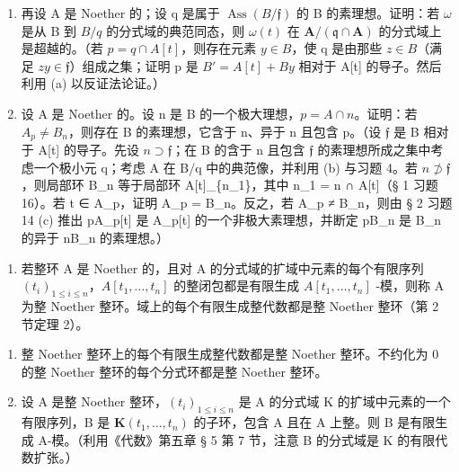 \begin{enumerate}
\def\labelenumi{(\alph{enumi})}
\setcounter{enumi}{1}
\item
  再设 A 是 Noether 的；设 q 是属于 \(\operatorname{Ass}(B/\mathfrak{f})\) 的 B 的素理想。证明：若 \(\omega\) 是从 B 到 \(B/q\) 的分式域的典范同态，则 \(\omega(t)\) 在 \(\mathbf{A}/(\mathfrak{q} \cap \mathbf{A})\) 的分式域上是超越的。（若 \(p = q \cap A[t]\)，则存在元素 \(y \in B\)，使 q 是由那些 \(z \in B\)（满足 \(zy \in \mathfrak{f}\)）组成之集；证明 p 是 \(B' = A[t] + By\) 相对于 A{[}t{]} 的导子。然后利用 (a) 以反证法论证。）
\item
  设 A 是 Noether 的。设 n 是 B 的一个极大理想，\(p = A \cap n\)。证明：若 \(A_{p} \neq B_{n}\)，则存在 B 的素理想，它含于 n、异于 n 且包含 p。（设 \(\mathfrak{f}\) 是 B 相对于 A{[}t{]} 的导子。先设 \(n \supset \mathfrak{f}\)；在 B 的含于 n 且包含 \(\mathfrak{f}\) 的素理想所成之集中考虑一个极小元 q；考虑 A 在 B/q 中的典范像，并利用 (b) 与习题 4。若 \(n \not\supset \mathfrak{f}\)，则局部环 B\_n 等于局部环 A{[}t{]}\_\{n\_1\}，其中 n\_1 = n ∩ A{[}t{]}（§ 1 习题 16）。若 t ∈ A\_p，证明 A\_p = B\_n。反之，若 A\_p ≠ B\_n，则由 § 2 习题 14 (c) 推出 pA\_p{[}t{]} 是 A\_p{[}t{]} 的一个非极大素理想，并断定 pB\_n 是 B\_n 的异于 nB\_n 的素理想。）
\end{enumerate}

\begin{enumerate}
\def\labelenumi{\arabic{enumi}.}
\setcounter{enumi}{5}
\tightlist
\item
  若整环 A 是 Noether 的，且对 A 的分式域的扩域中元素的每个有限序列 \((t_{i})_{1\leq i\leq n}\)，\(A[t_{1},\ldots,t_{n}]\) 的整闭包都是有限生成 \(A[t_{1},\ldots,t_{n}]\) -模，则称 A 为整 Noether 整环。域上的每个有限生成整代数都是整 Noether 整环（第 2 节定理 2）。
\end{enumerate}

\begin{enumerate}
\def\labelenumi{(\alph{enumi})}
\item
  整 Noether 整环上的每个有限生成整代数都是整 Noether 整环。不约化为 0 的整 Noether 整环的每个分式环都是整 Noether 整环。
\item
  设 A 是整 Noether 整环，\((t_{i})_{1\leq i\leq n}\) 是 A 的分式域 K 的扩域中元素的一个有限序列，B 是 \(\mathbf{K}(t_{1},\ldots,t_{n})\) 的子环，包含 A 且在 A 上整。则 B 是有限生成 A-模。（利用《代数》第五章 § 5 第 7 节，注意 B 的分式域是 K 的有限代数扩张。）
\end{enumerate}

